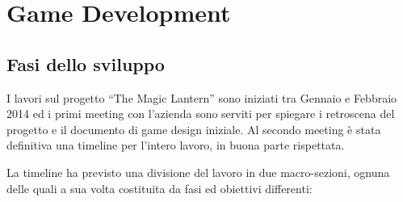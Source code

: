 \chapter{Game Development}
\label{chap:game_development}

\section{Fasi dello sviluppo}

I lavori sul progetto ``The Magic Lantern'' sono iniziati tra Gennaio e Febbraio 2014 ed i primi meeting con l'azienda sono serviti per spiegare i retroscena del progetto e il documento di game design iniziale.
Al secondo meeting è stata definitiva una timeline per l'intero lavoro, in buona parte rispettata. 

La timeline ha previsto una divisione del lavoro in due macro-sezioni, ognuna delle quali a sua volta costituita da fasi ed obiettivi differenti:

